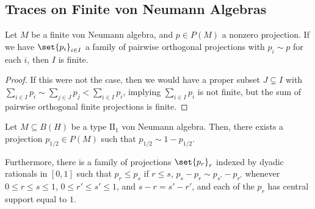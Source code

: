 \documentclass[10pt]{mypackage}
\begin{document}
\subsection{Traces on Finite von Neumann Algebras}%
\begin{lemma}
  Let $M$ be a finite von Neumann algebra, and $p\in P(M)$ a nonzero projection. If we have $\set{p_i}_{i\in I}$ a family of pairwise orthogonal projections with $p_i\sim p$ for each $i$, then $I$ is finite.
\end{lemma}
\begin{proof}
  If this were not the case, then we would have a proper subset $J\subsetneq I$ with $\sum_{i\in I}p_i \sim \sum_{j\in J}p_j < \sum_{i\in I}p_i$, implying $\sum_{i\in I}p_i$ is not finite, but the sum of pairwise orthogonal finite projections is finite.
\end{proof}
\begin{lemma}
  Let $M\subseteq B(H)$ be a type $\text{II}_{1}$ von Neumann algebra. Then, there exists a projection $p_{1/2}\in P(M)$ such that $p_{1/2}\sim 1-p_{1/2}$.

  Furthermore, there is a family of projections $\set{p_r}_{r}$ indexed by dyadic rationals in $[0,1]$ such that $p_{r}\leq p_s$ if $r\leq s$, $p_s-p_r\sim p_{s'}-p_{r'}$ whenever $0\leq r \leq s \leq 1$, $0\leq r'\leq s'\leq 1$, and $s-r = s'-r'$, and each of the $p_r$ has central support equal to $1$.
\end{lemma}
\end{document}
